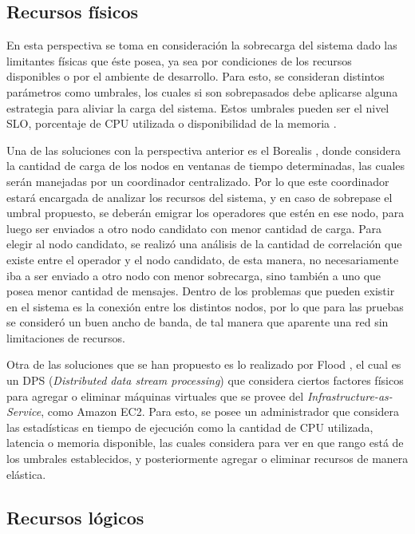 \subsection{Recursos físicos}
En esta perspectiva se toma en consideración la sobrecarga del sistema dado las limitantes físicas que éste posea, ya sea por condiciones de los recursos disponibles o por el ambiente de desarrollo. Para esto, se consideran distintos parámetros como umbrales, los cuales si son sobrepasados debe aplicarse alguna estrategia para aliviar la carga del sistema. Estos umbrales pueden ser el nivel SLO, porcentaje de CPU utilizada o disponibilidad de la memoria \citep{Dong06schedulingalgorithms}.

Una de las soluciones con la perspectiva anterior es el Borealis \citep{XingZH05}, donde considera la cantidad de carga de los nodos en ventanas de tiempo determinadas, las cuales serán manejadas por un coordinador centralizado. Por lo que este coordinador estará encargada de analizar los recursos del sistema, y en caso de sobrepase el umbral propuesto, se deberán emigrar los operadores que estén en ese nodo, para luego ser enviados a otro nodo candidato con menor cantidad de carga. Para elegir al nodo candidato, se realizó una análisis de la cantidad de correlación que existe entre el operador y el nodo candidato, de esta manera, no necesariamente iba a ser enviado a otro nodo con menor sobrecarga, sino también a uno que posea menor cantidad de mensajes. Dentro de los problemas que pueden existir en el sistema es la conexión entre los distintos nodos, por lo que para las pruebas se consideró un buen ancho de banda, de tal manera que aparente una red sin limitaciones de recursos.

Otra de las soluciones que se han propuesto es lo realizado por Flood \citep{Alves2010flood}, el cual es un DPS (\textit{Distributed data stream processing}) que considera ciertos factores físicos para agregar o eliminar máquinas virtuales que se provee del \textit{Infrastructure-as-Service}, como Amazon EC2. Para esto, se posee un administrador que considera las estadísticas en tiempo de ejecución como la cantidad de CPU utilizada, latencia o memoria disponible, las cuales considera para ver en que rango está de los umbrales establecidos, y posteriormente agregar o eliminar recursos de manera elástica.

\subsection{Recursos lógicos}

